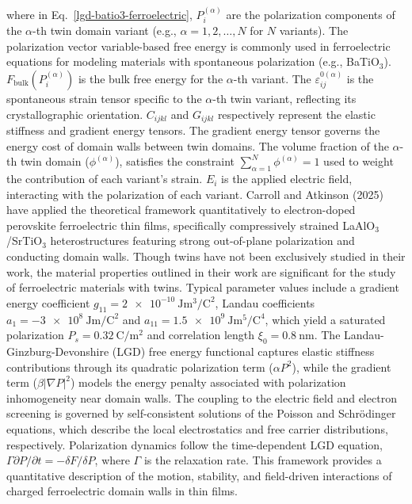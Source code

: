 \documentclass[a4paper,fleqn]{cas-sc}
\begin{document}
where in Eq.~\ref{lgd-batio3-ferroelectric}, \( P_i^{(\alpha)} \) are the polarization components of the \(\alpha\)-th twin domain variant (e.g., \(\alpha = 1, 2, \ldots, N\) for \(N\) variants). The polarization vector variable-based free energy is commonly used in ferroelectric equations for modeling materials with spontaneous polarization (e.g., BaTiO$_3$). \( F_{\text{bulk}}(P_i^{(\alpha)}) \) is the bulk free energy for the \(\alpha\)-th variant.  The  \( \varepsilon_{ij}^{0(\alpha)} \) is the spontaneous strain tensor specific to the \(\alpha\)-th twin variant, reflecting its crystallographic orientation.  \(C_{ijkl}\) and \(G_{ijkl}\) respectively represent the elastic stiffness and gradient energy tensors. The gradient energy tensor governs the energy cost of domain walls between twin domains. The volume fraction of the \(\alpha\)-th twin domain (\( \phi^{(\alpha)} \)), satisfies the constraint \(\sum_{\alpha=1}^N \phi^{(\alpha)} = 1\) used to weight the contribution of each variant's strain. \( E_i \) is the applied electric field, interacting with the polarization of each variant. Carroll and Atkinson (2025) \cite{carroll2025dynamics} have applied the theoretical framework quantitatively to electron-doped perovskite ferroelectric thin films, specifically compressively strained LaAlO$_3$/SrTiO$_3$ heterostructures featuring strong out-of-plane polarization and conducting domain walls. Though twins have not been exclusively studied in their work, the material properties outlined in their work are significant for the study of ferroelectric materials with twins. Typical parameter values include a gradient energy coefficient \( g_{11} = \SI{2e-10}{\joule\cubic\meter\per\coulomb\squared} \), Landau coefficients \( a_1 = \SI{-3e8}{\joule\meter\per\coulomb\squared} \) and \( a_{11} = \SI{1.5e9}{\joule\meter\tothe{5}\per\coulomb\tothe{4}} \), which yield a saturated polarization \( P_s = \SI{0.32}{\coulomb\per\meter\squared} \) and correlation length \( \xi_0 = \SI{0.8}{\nano\meter} \). The Landau-Ginzburg-Devonshire (LGD) free energy functional captures elastic stiffness contributions through its quadratic polarization term ($\alpha P^2$), while the gradient term ($\beta|\nabla P|^2$) models the energy penalty associated with polarization inhomogeneity near domain walls. The coupling to the electric field and electron screening is governed by self-consistent solutions of the Poisson and Schrödinger equations, which describe the local electrostatics and free carrier distributions, respectively. Polarization dynamics follow the time-dependent LGD equation, $\Gamma \partial P/\partial t = -\delta F/\delta P$, where $\Gamma$ is the relaxation rate. This framework provides a quantitative description of the motion, stability, and field-driven interactions of charged ferroelectric domain walls in thin films.
\end{document}
